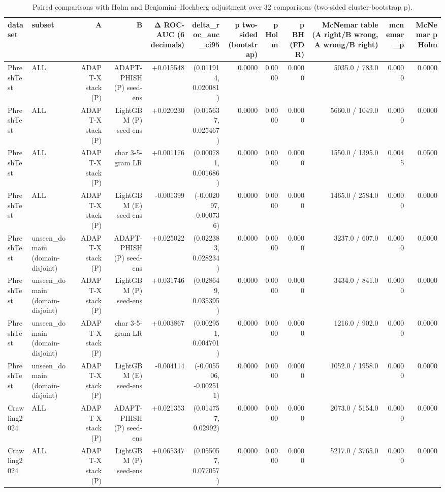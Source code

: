 \begin{table}[t]
\centering
\scriptsize
\caption{Paired comparisons with Holm and Benjamini–Hochberg adjustment over 32 comparisons (two-sided cluster-bootstrap p).}
\label{tab:rev_R11_paired_tests_holm}
\begin{tabular}{llrrrrrrrrrr}
\toprule
dataset & subset & A & B & Δ ROC-AUC (6 decimals) & delta\_roc\_auc\_ci95 & p two-sided (bootstrap) & p Holm & p BH (FDR) & McNemar table (A right/B wrong, A wrong/B right) & mcnemar\_p & McNemar p Holm \\
\midrule
PhreshTest & ALL & ADAPT-X stack (P) & ADAPT-PHISH (P) seed-ens & +0.015548 & (0.011914, 0.020081) & 0.0000 & 0.0000 & 0.0000 & 5035.0 / 783.0 & 0.0000 & 0.0000 \\
PhreshTest & ALL & ADAPT-X stack (P) & LightGBM (P) seed-ens & +0.020230 & (0.015637, 0.025467) & 0.0000 & 0.0000 & 0.0000 & 5660.0 / 1049.0 & 0.0000 & 0.0000 \\
PhreshTest & ALL & ADAPT-X stack (P) & char 3-5-gram LR & +0.001176 & (0.000781, 0.001686) & 0.0000 & 0.0000 & 0.0000 & 1550.0 / 1395.0 & 0.0045 & 0.0500 \\
PhreshTest & ALL & ADAPT-X stack (P) & LightGBM (E) seed-ens & -0.001399 & (-0.002097, -0.000736) & 0.0000 & 0.0000 & 0.0000 & 1465.0 / 2584.0 & 0.0000 & 0.0000 \\
PhreshTest & unseen\_domain (domain-disjoint) & ADAPT-X stack (P) & ADAPT-PHISH (P) seed-ens & +0.025022 & (0.022383, 0.028234) & 0.0000 & 0.0000 & 0.0000 & 3237.0 / 607.0 & 0.0000 & 0.0000 \\
PhreshTest & unseen\_domain (domain-disjoint) & ADAPT-X stack (P) & LightGBM (P) seed-ens & +0.031746 & (0.028649, 0.035395) & 0.0000 & 0.0000 & 0.0000 & 3434.0 / 841.0 & 0.0000 & 0.0000 \\
PhreshTest & unseen\_domain (domain-disjoint) & ADAPT-X stack (P) & char 3-5-gram LR & +0.003867 & (0.002951, 0.004701) & 0.0000 & 0.0000 & 0.0000 & 1216.0 / 902.0 & 0.0000 & 0.0000 \\
PhreshTest & unseen\_domain (domain-disjoint) & ADAPT-X stack (P) & LightGBM (E) seed-ens & -0.004114 & (-0.005506, -0.002511) & 0.0000 & 0.0000 & 0.0000 & 1052.0 / 1958.0 & 0.0000 & 0.0000 \\
Crawling2024 & ALL & ADAPT-X stack (P) & ADAPT-PHISH (P) seed-ens & +0.021353 & (0.014757, 0.02992) & 0.0000 & 0.0000 & 0.0000 & 2073.0 / 5154.0 & 0.0000 & 0.0000 \\
Crawling2024 & ALL & ADAPT-X stack (P) & LightGBM (P) seed-ens & +0.065347 & (0.055057, 0.077057) & 0.0000 & 0.0000 & 0.0000 & 5217.0 / 3765.0 & 0.0000 & 0.0000 \\

\end{tabular}
\end{table}
